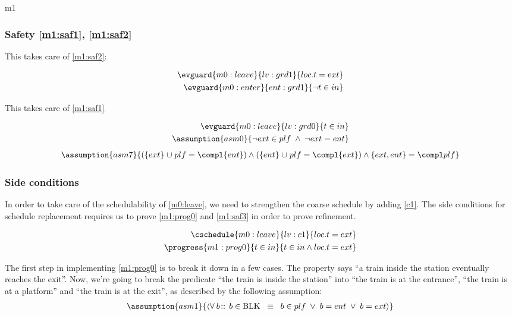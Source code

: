 \documentclass[12pt]{amsart}
\begin{document}
\begin{machine}{m1}
\subsubsection{Safety \ref{m1:saf1}, \ref{m1:saf2}}

This takes care of \eqref{m1:saf2}:

\begin{align*}
\evguard{m0:leave}{lv:grd1}
	{ loc.t = ext }
\\ \evguard{m0:enter}{ent:grd1}
	{ \neg t \in in }
\end{align*}

This takes care of \eqref{m1:saf1}

\begin{align*}
\evguard{m0:leave}{lv:grd0}
	{ t \in in }
\\ \assumption{asm0}
	{ \neg ext \in plf \1\land \neg ext = ent }
\end{align*}
\begin{align*} \assumption{asm7}{ (\{ ext \} \bunion plf = \compl \{ent\}) \land (\{ ent \} \bunion plf = \compl \{ext\}) \land \{ ext, ent \} = \compl plf } \end{align*}
\subsubsection{Side conditions}

In order to take care of the schedulability of \ref{m0:leave}, we need to strengthen the coarse schedule by adding \ref{c1}. The side conditions for schedule replacement requires us to prove \ref{m1:prog0} and \ref{m1:saf3} in order to prove refinement.

\begin{align*}
\cschedule{m0:leave}{lv:c1}
	{ loc.t = ext }
\\ \progress{m1:prog0}
	{ t \in in }{ t \in in \land loc.t = ext }
\end{align*}

The first step in implementing \eqref{m1:prog0} is to break it down in a few cases. The property says ``a train inside the station eventually reaches the exit''. Now, we're going to break the predicate ``the train is inside the station'' into ``the train is at the entrance'', ``the train is at a platform'' and ``the train is at the exit'', as described by the following assumption:
\begin{align*}
\assumption{asm1}
{	\qforall{b}{}{ b \in \Blk \2\equiv b \in plf \1\lor b = ent \1\lor b = ext }	}
\end{align*}


\end{machine}
\end{document}
